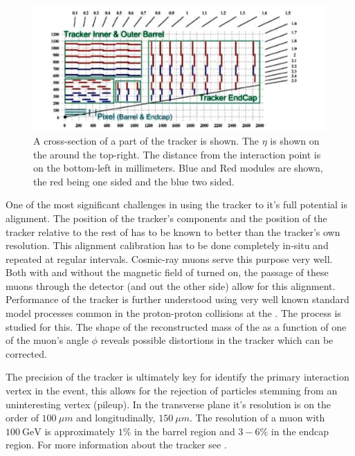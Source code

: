 \begin{figure}[!htbp]
    \centering
    \includegraphics[width=\textwidth]{figures/Tracker.jpeg}
    \caption[
       \CMS tracker diagram.
    ]{
        A cross-section of a part of the \CMS tracker is shown.  The \ensuremath{\eta} is shown on the around the top-right.  The distance from the interaction point is on the bottom-left in millimeters.  Blue and Red modules are shown, the red being one sided and the blue two sided. \cite{trackerPerf}
    }
    \label{fig:tracker}
\end{figure}

One of the most significant challenges in using the tracker to it's full potential is alignment.  The position of the tracker's components and the position of the tracker relative to the rest of \CMS has to be known to better than the tracker's own resolution.  This alignment calibration has to be done completely in-situ and repeated at regular intervals.  Cosmic-ray muons serve this purpose very well.  Both with and without the magnetic field of \CMS turned on, the passage of these muons through the detector (and out the other side) allow for this alignment.  Performance of the tracker is further understood using very well known standard model processes common in the proton-proton collisions at the \LHC.  The \Ztomumu process is studied for this.  The shape of the reconstructed mass of the \Z as a function of one of the muon's angle \ensuremath{\phi} reveals possible distortions in the tracker which can be corrected.

The precision of the tracker is ultimately key for identify the primary interaction vertex in the event, this allows for the rejection of particles stemming from an uninteresting vertex (pileup).  In the transverse plane it's resolution is on the order of \ensuremath{\SI{100}{\mu m}} and longitudinally, \ensuremath{\SI{150}{\mu m}}.  The resolution of a muon with \ensuremath{\SI{100}{\GeV}} is approximately \ensuremath{1\%} in the barrel region and \ensuremath{3-6\%} in the endcap region.  For more information about the tracker see \cite{trackerPerf}.

